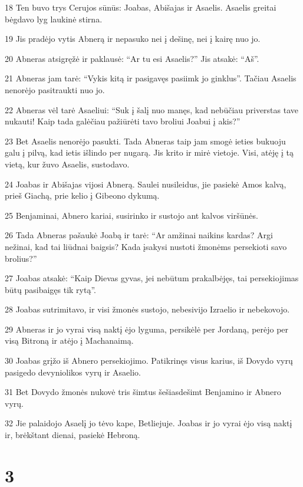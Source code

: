 \par 18 Ten buvo trys Cerujos sūnūs: Joabas, Abišajas ir Asaelis. Asaelis greitai bėgdavo lyg laukinė stirna. 
\par 19 Jis pradėjo vytis Abnerą ir nepasuko nei į dešinę, nei į kairę nuo jo. 
\par 20 Abneras atsigręžė ir paklausė: “Ar tu esi Asaelis?” Jis atsakė: “Aš”. 
\par 21 Abneras jam tarė: “Vykis kitą ir pasigavęs pasiimk jo ginklus”. Tačiau Asaelis nenorėjo pasitraukti nuo jo. 
\par 22 Abneras vėl tarė Asaeliui: “Suk į šalį nuo manęs, kad nebūčiau priverstas tave nukauti! Kaip tada galėčiau pažiūrėti tavo broliui Joabui į akis?” 
\par 23 Bet Asaelis nenorėjo pasukti. Tada Abneras taip jam smogė ieties bukuoju galu į pilvą, kad ietis išlindo per nugarą. Jis krito ir mirė vietoje. Visi, atėję į tą vietą, kur žuvo Asaelis, sustodavo. 
\par 24 Joabas ir Abišajas vijosi Abnerą. Saulei nusileidus, jie pasiekė Amos kalvą, prieš Giachą, prie kelio į Gibeono dykumą. 
\par 25 Benjaminai, Abnero kariai, susirinko ir sustojo ant kalvos viršūnės. 
\par 26 Tada Abneras pašaukė Joabą ir tarė: “Ar amžinai naikins kardas? Argi nežinai, kad tai liūdnai baigsis? Kada įsakysi nustoti žmonėms persekioti savo brolius?” 
\par 27 Joabas atsakė: “Kaip Dievas gyvas, jei nebūtum prakalbėjęs, tai persekiojimas būtų pasibaigęs tik rytą”. 
\par 28 Joabas sutrimitavo, ir visi žmonės sustojo, nebesivijo Izraelio ir nebekovojo. 
\par 29 Abneras ir jo vyrai visą naktį ėjo lyguma, persikėlė per Jordaną, perėjo per visą Bitroną ir atėjo į Machanaimą. 
\par 30 Joabas grįžo iš Abnero persekiojimo. Patikrinęs visus karius, iš Dovydo vyrų pasigedo devyniolikos vyrų ir Asaelio. 
\par 31 Bet Dovydo žmonės nukovė tris šimtus šešiasdešimt Benjamino ir Abnero vyrų. 
\par 32 Jie palaidojo Asaelį jo tėvo kape, Betliejuje. Joabas ir jo vyrai ėjo visą naktį ir, brėkštant dienai, pasiekė Hebroną.



\chapter{3}

